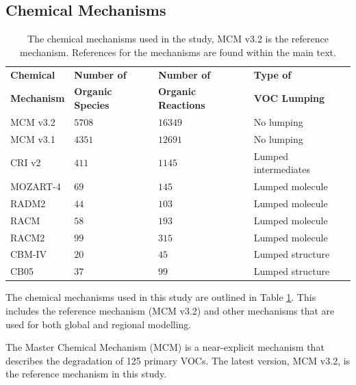 
\subsection{Chemical Mechanisms} \label{ss:mechanisms}

{
    \renewcommand{\arraystretch}{1.3}
    \begin{table}
        \begin{center}
            \begin{tabular}{llll}
                \hline \hline
                \textbf{Chemical} & \textbf{Number of} & \textbf{Number of} & \textbf{Type of} \\ 
                \textbf{Mechanism} & \textbf{Organic Species} & \textbf{Organic Reactions} & \textbf{VOC Lumping} \\ \hline
                MCM v3.2 & $5708$ & $16349$ & No lumping \\ \hline
                MCM v3.1 & $4351$ & $12691$ & No lumping \\ \hline
                CRI v2 & $411$ & $1145$ & Lumped intermediates \\ \hline
                MOZART-4 & $69$ & $145$ & Lumped molecule \\ \hline
                RADM2 & $44$ & $103$ & Lumped molecule \\ \hline
                RACM & $58$ & $193$ & Lumped molecule \\ \hline
                RACM2 & $99$ & $315$ & Lumped molecule \\ \hline
                CBM-IV & $20$ & $45$ & Lumped structure \\ \hline
                CB05 & $37$ & $99$ & Lumped structure \\ 
                \hline \hline
            \end{tabular}
        \end{center}
        \caption{The chemical mechanisms used in the study, MCM v3.2 is the reference mechanism. References for the mechanisms are found within the main text.}
        \label{t:mechanisms}
    \end{table}
}

The chemical mechanisms used in this study are outlined in Table \ref{t:mechanisms}. 
This includes the reference mechanism (MCM v3.2) and other mechanisms that are used for both global and regional modelling. 

The Master Chemical Mechanism (MCM) \citep{Jenkin:1997, Jenkin:2003, Saunders:2003, Bloss:2005, MCM_Site} is a near-explicit mechanism that describes the degradation of 125 primary VOCs. 
The latest version, MCM v3.2, is the reference mechanism in this study.

